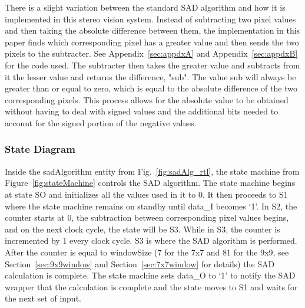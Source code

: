 There is a slight variation between the standard SAD algorithm and how it is implemented in this stereo vision system. Instead of subtracting two pixel values and then taking the absolute difference between them, the implementation in this paper finds which corresponding pixel has a greater value and then sends the two pixels to the subtracter. See Appendix~\ref{sec:appdxA} and Appendix~\ref{sec:appdxB} for the code used. The subtracter then takes the greater value and subtracts from it the lesser value and returns the difference, "sub". The value sub will always be greater than or equal to zero, which is equal to the absolute difference of the two corresponding pixels. This process allows for the absolute value to be obtained without having to deal with signed values and the additional bits needed to account for the signed portion of the negative values. 


\subsubsection{State Diagram}

Inside the sadAlgorithm entity from Fig.~\ref{fig:sadAlg_rtl}, the state machine from Figure~\ref{fig:stateMachine} controls the SAD algorithm. The state machine begins at state SO and initializes all the values used in it to 0. It then proceeds to S1 where the state machine remains on standby until data\_I becomes `1'. In S2, the counter starts at 0, the subtraction between corresponding pixel values begins, and on the next clock cycle, the state will be S3. While in S3, the counter is incremented by 1 every clock cycle. S3 is where the SAD algorithm is performed. After the counter is equal to windowSize (7 for the 7x7 and 81 for the 9x9, see Section~\ref{sec:9x9window} and Section~\ref{sec:7x7window} for details) the SAD calculation is complete. The state machine sets data\_O to `1' to notify the SAD wrapper that the calculation is complete and the state moves to S1 and waits for the next set of input.

